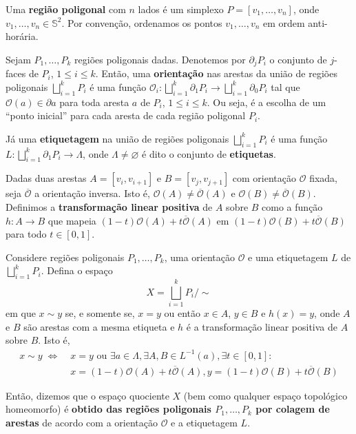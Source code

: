 \begin{defi}
    Uma \textbf{região poligonal} com $n$ lados é um simplexo $P = [v_1,\ldots,v_n]$, onde $v_1,\ldots, v_n \in \mathbb{S}^2$. Por convenção, ordenamos os pontos $v_1,\ldots, v_n$ em ordem anti-horária.

    Sejam $P_1,\ldots, P_k$ regiões poligonais dadas. Denotemos por $\partial_j P_i$ o conjunto de $j$-faces de $P_i$, $1\leq i\leq k$. Então, uma \textbf{orientação} nas arestas da união de regiões poligonais $\bigsqcup_{i=1}^k P_i$ é uma função $\mathcal{O}_i: \bigsqcup_{i=1}^k\partial_1 P_i\to \bigsqcup_{i=1}^k\partial_0 P_i$ tal que $\mathcal{O}(a) \in \partial a$ para toda aresta $a$ de $P_i$, $1\leq i\leq k$. Ou seja, é a escolha de um ``ponto inicial'' para cada aresta de cada região poligonal $P_i$.

    Já uma \textbf{etiquetagem} na união de regiões poligonais $\bigsqcup_{i=1}^k P_i$ é uma função $L: \bigsqcup_{i=1}^k\partial_1 P_i\to \Lambda$, onde $\Lambda \neq \varnothing$ é dito o conjunto de \textbf{etiquetas}.
\end{defi}

\begin{defi}
    Dadas duas arestas $A = [v_i, v_{i+1}]$ e $B = [v_j, v_{j+1}]$ com orientação $\mathcal{O}$ fixada, seja $\overline{\mathcal{O}}$ a orientação inversa. Isto é, $\mathcal{O}(A) \neq \overline{\mathcal{O}}(A)$ e $\mathcal{O}(B) \neq \overline{\mathcal{O}}(B)$. Definimos a \textbf{transformação linear positiva} de $A$ sobre $B$ como a função $h: A\to B$ que mapeia $(1-t) \mathcal{O}(A) + t \overline{\mathcal{O}}(A)$ em $(1-t) \mathcal{O}(B) + t \overline{\mathcal{O}}(B)$ para todo $t \in [0,1]$.
    
    Considere regiões poligonais $P_1,\ldots, P_k$, uma orientação $\mathcal{O}$ e uma etiquetagem $L$ de $\bigsqcup_{i=1}^k P_i$. Defina o espaço
    \[X = \bigsqcup_{i=1}^k P_i/\sim\]
    em que $x \sim y$ se, e somente se, $x = y$ ou então $x \in A$, $y \in B$ e $h(x) = y$, onde $A$ e $B$ são arestas com a mesma etiqueta e $h$ é a transformação linear positiva de $A$ sobre $B$. Isto é,
    \begin{align*}
        x \sim y \;\Longleftrightarrow \;
        &x=y\text{ ou }\exists a \in \Lambda, \exists A,B \in L^{-1}(a), \exists t\in [0,1]:\\ 
        &x = (1-t) \mathcal{O}(A) + t \overline{\mathcal{O}}(A), 
        y = (1-t) \mathcal{O}(B) + t \overline{\mathcal{O}}(B)
    \end{align*}
    
    Então, dizemos que o espaço quociente $X$ (bem como qualquer espaço topológico homeomorfo) é \textbf{obtido das regiões poligonais $P_1,\ldots, P_k$ por colagem de arestas} de acordo com a orientação $\mathcal{O}$ e a etiquetagem $L$.
\end{defi}


